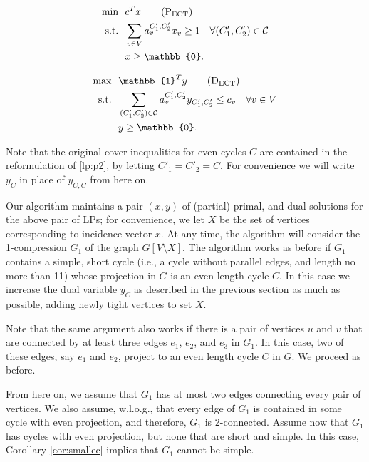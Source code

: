 \documentclass{article}
\newcommand{\st}{\ensuremath{\mbox{s.t.}}}
\newcommand{\ect}{\ensuremath{\mbox{ECT}}}
\newcommand{\C}{\ensuremath{\mathcal{C}}}
\newcommand{\0}{\mathbb{0}}
\newcommand{\1}{\mathbb{1}}
\begin{document}
\hspace*{-.7cm}
\begin{minipage}{.48\textwidth}
\begin{align}
  \min ~~ & c^Tx \tag{$\mbox{P}_{\scriptsize \ect}$} \label{lp:p3} \\
  \st ~~ & \sum_{v \in V}a^{C'_1,C'_2}_vx_v \geq 1 \quad \forall 
  (C'_1,C'_2) \in \C \notag \\
          & x \geq \0. \notag
\end{align}
\end{minipage}
\hspace*{1ex}
\vline
\hspace*{1ex}
\begin{minipage}{.48\textwidth}
\begin{align}
  \max ~~ & \1^Ty \tag{$\mbox{D}_{\scriptsize \ect}$} \label{lp:d3} \\
  \st ~~ & \sum_{(C'_1,C'_2) \in \C} a^{C'_1,C'_2}_vy_{C'_1,C'_2} \leq c_v \quad \forall v
  \in V
           \notag \\
          & y \geq \0. \notag
\end{align}
\end{minipage}
\medskip

Note that the original cover inequalities for even cycles 
$C$ are contained in the reformulation of \eqref{lp:p2}, by
letting $C'_1=C'_2=C$. For convenience we will write
$y_C$ in place of $y_{C,C}$ from here on. 

Our algorithm maintains a pair $(x,y)$ of (partial) primal,
and dual solutions for the above pair of LPs; for convenience, we let $X$ be the set of vertices
corresponding to incidence vector $x$. 
At any time, the algorithm will consider the 1-compression $G_1$
of the graph $G[V\setminus X]$. The algorithm works as before if $G_1$
contains a simple, short cycle (i.e., a cycle without parallel edges, and length no more
than 11) whose
projection in $G$ is an even-length cycle $C$. In this case we
increase the dual variable $y_{C}$ as described in the previous
section as much as possible, adding newly tight vertices to set $X$. 

Note that the same argument also works if there is a pair of vertices $u$ and $v$ that are connected
by at least three edges $e_1$, $e_2$, and $e_3$ in $G_1$. In this case, two of these edges, say
$e_1$ and $e_2$, project to an even length cycle $C$ in $G$. We proceed as before.

From here on, we assume that $G_1$ has at most two edges connecting every pair of vertices. 
We also assume, w.l.o.g., that every edge of $G_1$ is contained in some cycle with even projection,
and therefore, $G_1$ is 2-connected. Assume now that $G_1$ has cycles with even projection, but none
that are short and simple. In this case, Corollary \ref{cor:smallec} implies that $G_1$
cannot be simple. 
\end{document}
